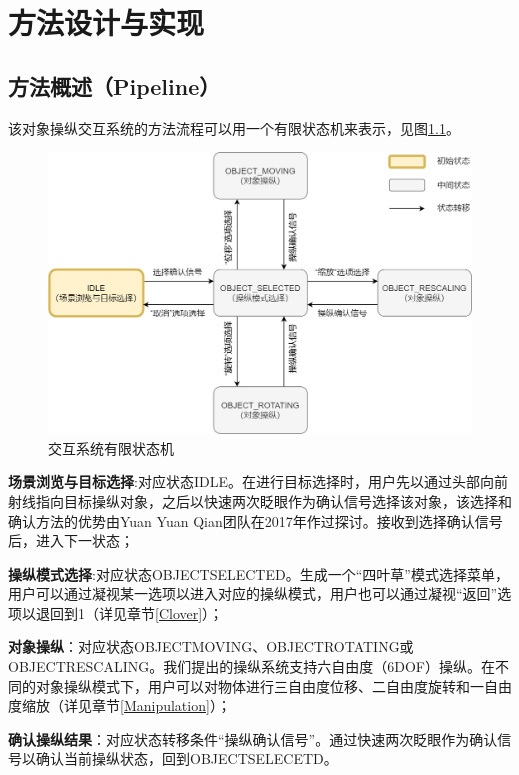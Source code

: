 
\chapter{方法设计与实现}

\section{方法概述（Pipeline）}

该对象操纵交互系统的方法流程可以用一个有限状态机来表示，见图\ref{fig-3-1}。

\begin{figure}[b!]
    \centering
    \includegraphics[width=.85\textwidth]{figure/system_state_machine.png}
    \caption{交互系统有限状态机}
    \label{fig-3-1}
\end{figure}

{\bf 场景浏览与目标选择}:对应状态IDLE。在进行目标选择时，用户先以通过头部向前射线指向目标操纵对象，之后以快速两次眨眼作为确认信号选择该对象，该选择和确认方法的优势由Yuan Yuan Qian团队在2017年作过探讨。接收到选择确认信号后，进入下一状态；

{\bf 操纵模式选择}:对应状态OBJECT\us SELECTED。生成一个“四叶草”模式选择菜单，用户可以通过凝视某一选项以进入对应的操纵模式，用户也可以通过凝视“返回”选项以退回到1（详见章节\ref{Clover}）；

{\bf 对象操纵}：对应状态OBJECT\us MOVING、OBJECT\us ROTATING或OBJECT\us RESCALING。我们提出的操纵系统支持六自由度（6DOF）操纵。在不同的对象操纵模式下，用户可以对物体进行三自由度位移、二自由度旋转和一自由度缩放（详见章节\ref{Manipulation}）；

{\bf 确认操纵结果}：对应状态转移条件“操纵确认信号”。通过快速两次眨眼作为确认信号以确认当前操纵状态，回到OBJECT\us SELECETD。

